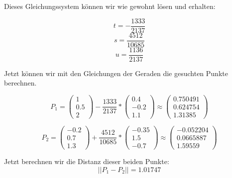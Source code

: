 \documentclass{article}
\begin{document}
Dieses Gleichungssystem können wir wie gewohnt lösen und erhalten:

\begin{multicols}{3}
    \[
        t = -\frac{1333}{2137}
    \]
    \break
    \[
        s = \frac{4512}{10685}
    \]
    \break
    \[
        u = \frac{1136}{2137}
    \]
\end{multicols}

Jetzt können wir mit den Gleichungen der Geraden die gesuchten Punkte berechnen.

\[
    P_1 = 
    \begin{pmatrix}
        1 \\ 0.5 \\ 2
    \end{pmatrix}
    - \frac{1333}{2137} * 
    \begin{pmatrix}
        0.4 \\ -0.2 \\ 1.1
    \end{pmatrix}
    \approx
    \begin{pmatrix}
        0.750491 \\ 0.624754 \\ 1.31385
    \end{pmatrix}
\]

\[
    P_2 = 
    \begin{pmatrix}
        -0.2 \\ 0.7 \\ 1.3
    \end{pmatrix}
    + \frac{4512}{10685} *
    \begin{pmatrix}
        -0.35 \\ 1.5 \\ -0.7
    \end{pmatrix}
    \approx 
    \begin{pmatrix}
        -0.052204 \\ 0.0665887 \\ 1.59559
    \end{pmatrix}
\]

Jetzt berechnen wir die Distanz dieser beiden Punkte:
\[
    ||P_1-P_2|| = 1.01747
\]
\end{document}
